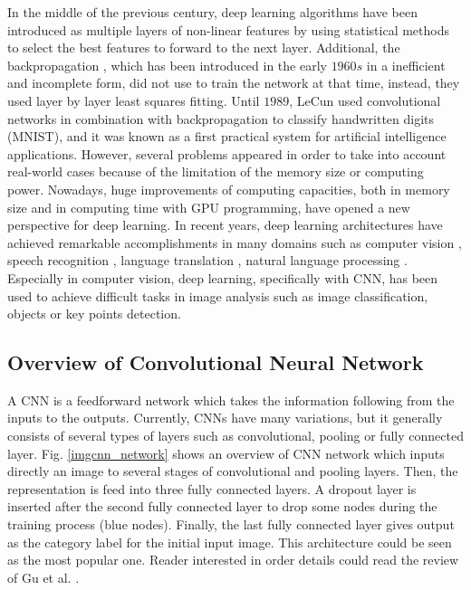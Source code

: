 \documentclass[review]{elsarticle}
\begin{document}
In the middle of the previous century, deep learning algorithms
have been introduced as multiple layers of non-linear features by using statistical methods to select the best features to forward to the next layer. Additional, the backpropagation \cite{lecun1989backpropagation}, which has been introduced in the early $1960s$ in a inefficient and incomplete form, did not use to train the network at that time, instead, they used layer by layer least squares fitting. Until $1989$, LeCun \cite{lecun1998gradient} used convolutional networks in combination with backpropagation to classify handwritten digits (MNIST), and it was known as a first practical system for artificial
intelligence applications. However, several problems  appeared in
order to take into account real-world cases because of the limitation
of the memory size or computing power. Nowadays, huge improvements of
computing capacities, both in memory size and in computing time with
GPU programming, have opened a new perspective for deep learning. In
recent years, deep learning architectures have achieved remarkable
accomplishments in many domains such as computer vision
\cite{lecun1998gradient, krizhevsky2012imagenet,
  szegedy2015going,farabet2013learning,li2015convolutional, vu2018heritage}, speech
recognition \cite{hinton2012deep, mikolov2011strategies}, language
translation \cite{jean2014using, sutskever2014sequence}, natural
language processing \cite{lecun2015deep, collobert2011natural,
  collobert2008unified}. Especially in computer vision, deep learning,
specifically with CNN, has been used to achieve difficult tasks in
image analysis such as image classification, objects or key points
detection.


\subsection{Overview of Convolutional Neural Network}
A CNN is a feedforward network which takes the information following from the inputs to the outputs. Currently, CNNs have many variations, but it generally consists of several types of layers such as convolutional, pooling or fully connected layer. Fig. \ref{imgcnn_network} shows an overview of CNN network which inputs directly an image to several stages of convolutional and pooling layers. Then, the representation is feed into three fully connected layers. A dropout layer is inserted after the second fully connected layer to drop some nodes during the training process (blue nodes). Finally, the last fully connected layer gives output as the category label for the initial input image. This architecture could be seen as the most popular one. Reader interested in order details could read the review of Gu et al. \cite{gu2018recent}. 
\end{document}
